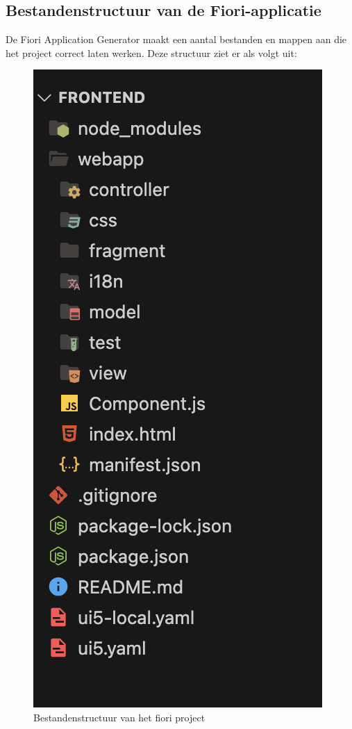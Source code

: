 \subsection{Bestandenstructuur van de Fiori-applicatie}
De Fiori Application Generator maakt een aantal bestanden en mappen aan die het project correct laten werken. Deze structuur ziet er als volgt uit:

\begin{figure}[H]
    \centering
    \includegraphics[scale=0.4]{./graphics/projectstructuur_fiori.png}
    \caption{Bestandenstructuur van het fiori project}
    \label{fig:fiori-generator}
\end{figure}

